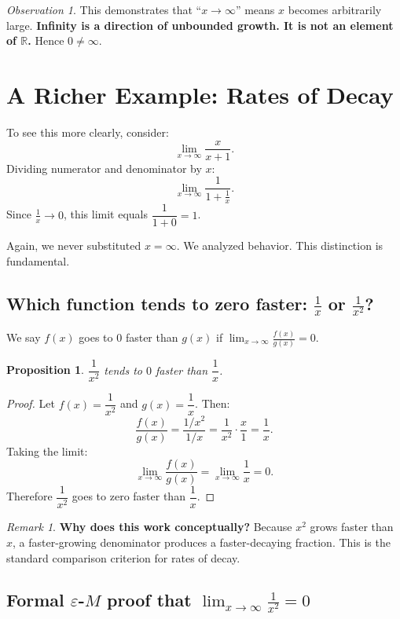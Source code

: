 \documentclass[12pt, a4paper]{article}
\newtheorem{proposition}[theorem]{Proposition}
\theoremstyle{definition}
\theoremstyle{remark}
\newtheorem*{remark}{Remark}
\newtheorem*{observation}{Observation}
\begin{document}
\begin{observation}
This demonstrates that ``$x \to \infty$'' means $x$ becomes arbitrarily large. \textbf{Infinity is a direction of unbounded growth. It is not an element of $\mathbb{R}$.} Hence $0 \neq \infty$.
\end{observation}

\section{A Richer Example: Rates of Decay}

To see this more clearly, consider:
\[
\lim_{x \to \infty} \frac{x}{x+1}.
\]
Dividing numerator and denominator by $x$:
\[
\lim_{x \to \infty} \frac{1}{1 + \frac{1}{x}}.
\]
Since $\frac{1}{x} \to 0$, this limit equals $\dfrac{1}{1+0} = 1$.

Again, we never substituted $x = \infty$. We analyzed behavior. This distinction is fundamental.

\subsection{Which function tends to zero faster: $\frac{1}{x}$ or $\frac{1}{x^2}$?}

We say $f(x)$ goes to $0$ faster than $g(x)$ if $\displaystyle\lim_{x\to\infty} \frac{f(x)}{g(x)} = 0$.

\begin{proposition}
$\dfrac{1}{x^2}$ tends to $0$ faster than $\dfrac{1}{x}$.
\end{proposition}

\begin{proof}
Let $f(x) = \dfrac{1}{x^2}$ and $g(x) = \dfrac{1}{x}$. Then:
\[
\frac{f(x)}{g(x)} = \frac{1/x^2}{1/x} = \frac{1}{x^2} \cdot \frac{x}{1} = \frac{1}{x}.
\]
Taking the limit:
\[
\lim_{x \to \infty} \frac{f(x)}{g(x)} = \lim_{x \to \infty} \frac{1}{x} = 0.
\]
Therefore $\dfrac{1}{x^2}$ goes to zero faster than $\dfrac{1}{x}$.
\end{proof}

\begin{remark}
\textbf{Why does this work conceptually?} Because $x^2$ grows faster than $x$, a faster-growing denominator produces a faster-decaying fraction. This is the standard comparison criterion for rates of decay.
\end{remark}

\subsection{Formal $\varepsilon$-$M$ proof that $\displaystyle\lim_{x\to\infty} \frac{1}{x^2} = 0$}
\end{document}
